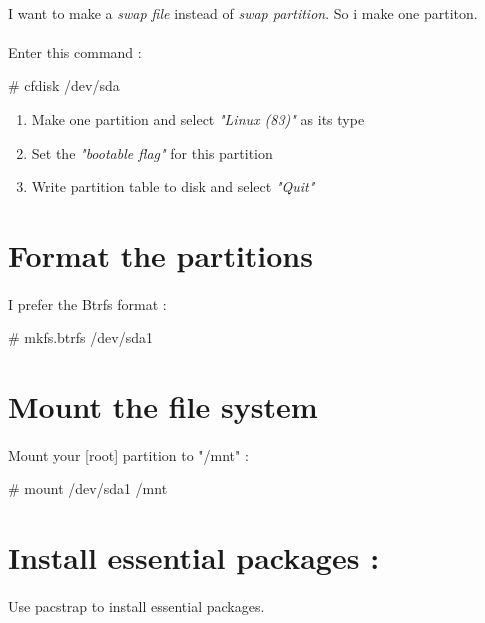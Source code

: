 \documentclass[12pt, a4paper]{article}
\begin{document}
\paragraph{}
I want to make a \emph{swap file} instead of \emph{swap partition}. So i make one partiton.

\paragraph{}
Enter this command :
\begin{center}
	\# cfdisk /dev/sda
\end{center}

\begin{enumerate}
	\item Make one partition and select \emph{"Linux (83)"} as its type
	\item Set the \emph{"bootable flag"} for this partition
	\item Write partition table to disk and select \emph{"Quit"}
\end{enumerate}

\section{Format the partitions}
\paragraph{}
I prefer the Btrfs format :
\begin{center}
	\# mkfs.btrfs /dev/sda1
\end{center}

\section{Mount the file system}
\paragraph{}
Mount your [root] partition to "/mnt" :

\begin{center}
	\# mount /dev/sda1 /mnt
\end{center}

\section{Install essential packages :}
\paragraph{}
Use pacstrap to install essential packages.
\end{document}
